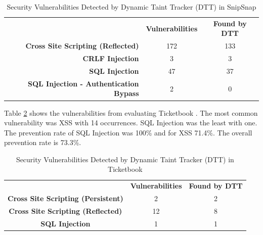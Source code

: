 \begin{table}[!hbt]
  \centering
  \caption{Security Vulnerabilities Detected by Dynamic Taint Tracker (DTT) in SnipSnap}
  \label{table:SnipSnapTable}
  \begin{tabular}{rcc}
    & \textbf{Vulnerabilities} & \textbf{Found by DTT} \\
    \textbf{Cross Site Scripting (Reflected)}      & 172           & 133  \\
    \textbf{CRLF Injection}                        & 3             & 3    \\
    \textbf{SQL Injection}                         & 47            & 37   \\
    \textbf{SQL Injection - Authentication Bypass} & 2             & 0       
  \end{tabular}
\end{table}

Table \ref{table:Ticketbook} shows the vulnerabilities from evaluating Ticketbook \parencite{ticketbook}. The most common vulnerability was XSS with 14 occurrences. SQL Injection was the least with one. The prevention rate of SQL Injection was 100\% and for XSS 71.4\%. The overall prevention rate is 73.3\%.

\begin{table}[!hbt]
  \centering
  \caption{Security Vulnerabilities Detected by Dynamic Taint Tracker (DTT) in Ticketbook}
  \label{table:Ticketbook}
  \begin{tabular}{ccc}
    & \textbf{Vulnerabilities} & \textbf{Found by DTT} \\
    \textbf{Cross Site Scripting (Persistent)} & 2             & 2 \\
    \textbf{Cross Site Scripting (Reflected)}  & 12            & 8 \\
    \textbf{SQL Injection}                     & 1             & 1
  \end{tabular}
\end{table}